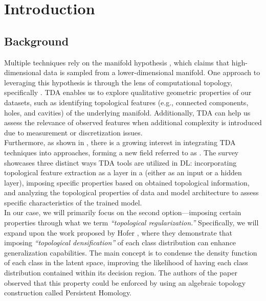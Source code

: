 \documentclass[../main.tex]{subfiles}
\begin{document}
\chapter{Introduction}
\label{ch:introduction}


\section{Background}
\label{sec:background}

Multiple  techniques rely on the manifold hypothesis \cite{fefferman_testing_2016}, which claims that high-dimensional data is sampled from a lower-dimensional manifold. One approach to leveraging this hypothesis is through the lens of computational topology, specifically . TDA enables us to explore qualitative geometric properties of our datasets, such as identifying topological features (e.g., connected components, holes, and cavities) of the underlying manifold. Additionally, TDA can help us assess the relevance of observed features when additional complexity is introduced due to measurement or discretization issues.\\

Furthermore, as shown in \cite{hensel_survey_2021}, there is a growing interest in integrating TDA techniques into  approaches, forming a new field referred to as . The survey showcases three distinct ways TDA tools are utilized in DL: incorporating topological feature extraction as a layer in a  (either as an input or a hidden layer), imposing specific properties based on obtained topological information, and analyzing the topological properties of data and model architecture to assess specific characteristics of the trained model.\\


In our case, we will primarily focus on the second option—imposing certain properties through what we term \emph{``topological regularization.''} Specifically, we will expand upon the work proposed by Hofer \etal \cite{hofer_densified_2021}, where they demonstrate that imposing \emph{``topological densification''} of each class distribution can enhance generalization capabilities. The main concept is to condense the density function of each class in the latent space, improving the likelihood of having each class distribution contained within its decision region. The authors of the paper observed that this property could be enforced by using an algebraic topology construction called Persistent Homology.\\
\end{document}
